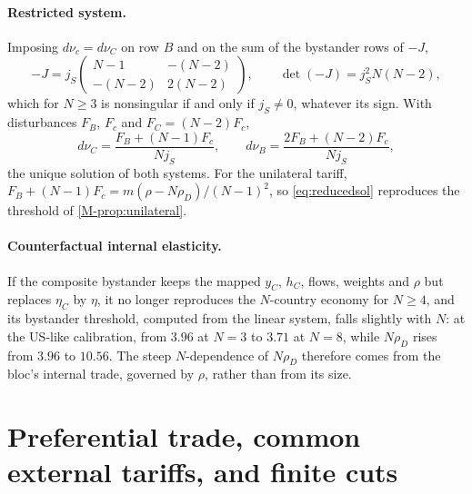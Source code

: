\documentclass[11pt]{article}
\numberwithin{equation}{section}
\theoremstyle{plain}
\begin{document}
\paragraph{Restricted system.} Imposing $d\nu_c=d\nu_C$ on row $B$ and on the sum of the bystander rows of $-J$,
\begin{equation}
-J=j_S\begin{pmatrix}N-1&-(N-2)\\-(N-2)&2(N-2)\end{pmatrix},\qquad \det(-J)=j_S^2N(N-2),
\end{equation}
which for $N\geq3$ is nonsingular if and only if $j_S\neq0$, whatever its sign. With disturbances $F_B$, $F_c$ and $F_C=(N-2)F_c$,
\begin{equation}
d\nu_C=\frac{F_B+(N-1)F_c}{Nj_S},\qquad d\nu_B=\frac{2F_B+(N-2)F_c}{Nj_S},
\label{eq:reducedsol}
\end{equation}
the unique solution of both systems. For the unilateral tariff, $F_B+(N-1)F_c=m(\rho-N\rho_D)/(N-1)^2$, so \cref{eq:reducedsol} reproduces the threshold of \cref{M-prop:unilateral}.

\paragraph{Counterfactual internal elasticity.} If the composite bystander keeps the mapped $y_C$, $h_C$, flows, weights and $\rho$ but replaces $\eta_C$ by $\eta$, it no longer reproduces the $N$-country economy for $N\geq4$, and its bystander threshold, computed from the linear system, falls slightly with $N$: at the US-like calibration, from $3.96$ at $N=3$ to $3.71$ at $N=8$, while $N\rho_D$ rises from $3.96$ to $10.56$. The steep $N$-dependence of $N\rho_D$ therefore comes from the bloc's internal trade, governed by $\rho$, rather than from its size.

\section{Preferential trade, common external tariffs, and finite cuts}
\end{document}

